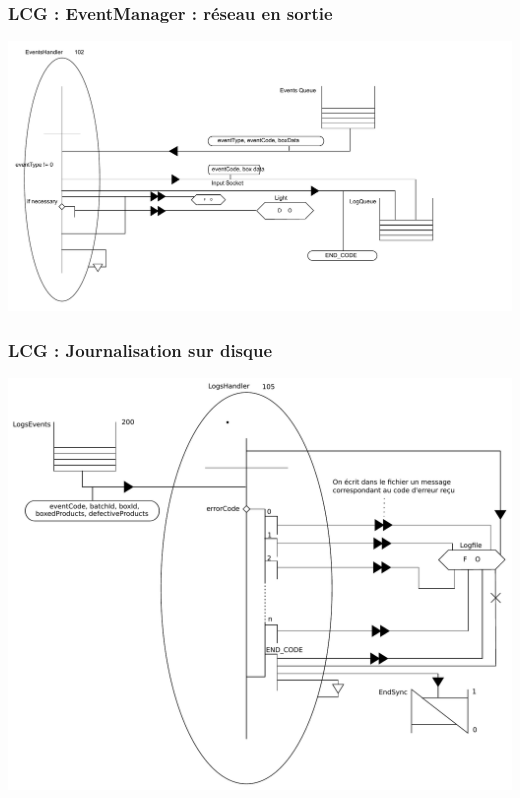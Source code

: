 \documentclass{beamer}
\begin{document}
	\begin{frame}

	    \frametitle{LCG : EventManager : réseau en sortie}

	    \includegraphics[width=\textwidth]{../SchemasLCG/src/EventsManager.pdf}

	\end{frame}

	

	

	\begin{frame}

	    \frametitle{LCG : Journalisation sur disque}

	    \includegraphics[width=\textwidth]{../SchemasLCG/LogsManager.pdf}

	\end{frame}

	
\end{document}
